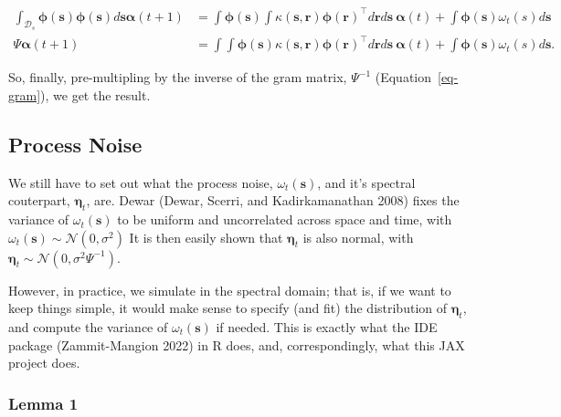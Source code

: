 \documentclass[
  letterpaper,
  DIV=11,
  numbers=noendperiod]{scrartcl}
\begin{document}
\[
\begin{split}
\int_{\mathcal D_s} \boldsymbol{\mathbf{\phi}}(\boldsymbol{\mathbf{s}})\boldsymbol{\mathbf{\phi}}(\boldsymbol{\mathbf{s}}) d\boldsymbol{\mathbf{s}} \boldsymbol{\mathbf{\alpha}}(t+1) &= \int\boldsymbol{\mathbf{\phi}}(\boldsymbol{\mathbf{s}})\int \kappa(\boldsymbol{\mathbf{s}}, \boldsymbol{\mathbf{r}})\boldsymbol{\mathbf{\phi}}(\boldsymbol{\mathbf{r}})^\intercal d\boldsymbol{\mathbf{r}}  d \boldsymbol{\mathbf{s}}\ \boldsymbol{\mathbf{\alpha}}(t) + \int \boldsymbol{\mathbf{\phi}}(\boldsymbol{\mathbf{s}})\omega_t(s)d\boldsymbol{\mathbf{s}}\\
\Psi \boldsymbol{\mathbf{\alpha}}(t+1) &= \int\int \boldsymbol{\mathbf{\phi}}(\boldsymbol{\mathbf{s}})\kappa(\boldsymbol{\mathbf{s}}, \boldsymbol{\mathbf{r}}) \boldsymbol{\mathbf{\phi}}(\boldsymbol{\mathbf{r}})^\intercal d\boldsymbol{\mathbf{r}} d \boldsymbol{\mathbf{s}}\ \boldsymbol{\mathbf{\alpha}}(t) + \int \boldsymbol{\mathbf{\phi}}(\boldsymbol{\mathbf{s}})\omega_t(s)d\boldsymbol{\mathbf{s}}.
\end{split}
\]

So, finally, pre-multipling by the inverse of the gram matrix,
\(\Psi^{-1}\) (Equation~\ref{eq-gram}), we get the result.

\subsection{Process Noise}\label{process-noise}

We still have to set out what the process noise,
\(\omega_t(\boldsymbol{\mathbf{s}})\), and it's spectral couterpart,
\(\boldsymbol{\mathbf{\eta}}_t\), are. Dewar (Dewar, Scerri, and
Kadirkamanathan 2008) fixes the variance of
\(\omega_t(\boldsymbol{\mathbf{s}})\) to be uniform and uncorrelated
across space and time, with
\(\omega_t(\boldsymbol{\mathbf{s}}) \sim \mathcal N(0,\sigma^2)\) It is
then easily shown that \(\boldsymbol{\mathbf{\eta}}_t\) is also normal,
with
\(\boldsymbol{\mathbf{\eta}}_t \sim \mathcal N(0, \sigma^2\Psi^{-1})\).

However, in practice, we simulate in the spectral domain; that is, if we
want to keep things simple, it would make sense to specify (and fit) the
distribution of \(\boldsymbol{\mathbf{\eta}}_t\), and compute the
variance of \(\omega_t(\boldsymbol{\mathbf{s}})\) if needed. This is
exactly what the IDE package (Zammit-Mangion 2022) in R does, and,
correspondingly, what this JAX project does.

\subsubsection{Lemma 1}\label{lemma-1}
\end{document}
